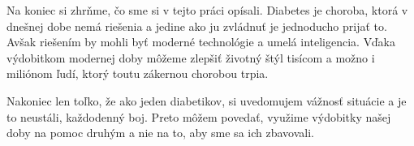 Na koniec si zhrňme, čo sme si v tejto práci opísali. Diabetes je choroba, ktorá v dnešnej dobe nemá riešenia a jedine ako ju zvládnuť je jednoducho prijať to. Avšak riešením by mohli byť moderné technológie a umelá inteligencia.
Vďaka výdobitkom modernej doby môžeme zlepšiť životný štýl tisícom a možno i miliónom ľudí, ktorý toutu zákernou chorobou trpia.

Nakoniec len toľko, že ako jeden diabetikov, si uvedomujem vážnosť situácie a je to neustáli, každodenný boj.
Preto môžem povedať, využime výdobitky našej doby na pomoc druhým a nie na to, aby sme sa ich zbavovali.